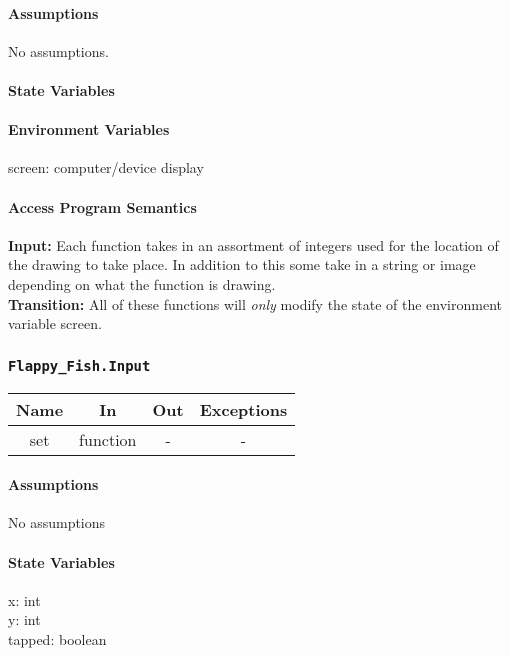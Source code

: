 \documentclass[11pt, oneside]{article}   	%
\begin{document}
\paragraph{Assumptions}
No assumptions.

\paragraph{State Variables}

\paragraph{Environment Variables}
screen: computer/device display

\paragraph{Access Program Semantics} 
 \textbf{Input:} Each function takes in an assortment of integers used for the location of the drawing to take place. In addition to this some take in a string or image depending on what the function is drawing.\\
 \textbf{Transition:} All of these functions will \textit{only} modify the state of the environment variable screen.

\subsubsection{\texttt{Flappy\_Fish.Input}}



\begin{center}
\begin{tabular}{ |c|c|c|c| } 
 \hline
 Name & In & Out & Exceptions \\ 
 \hline \hline
 set & function & - & - \\ 
 \hline
\end{tabular}
\end{center}

\paragraph{Assumptions}
No assumptions

\paragraph{State Variables}
x: int\\
y: int\\
tapped: boolean
\end{document}
